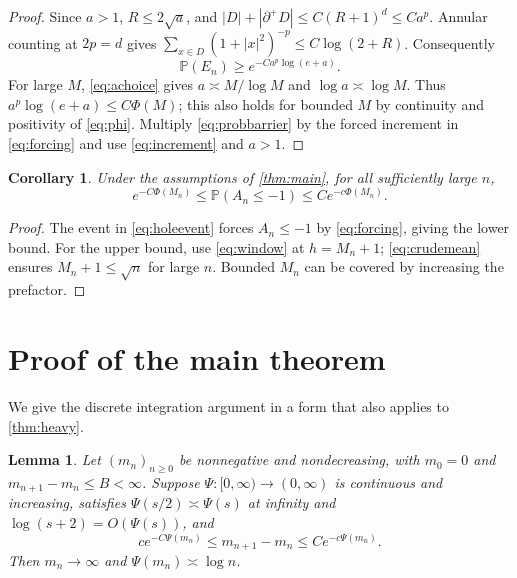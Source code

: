 \documentclass[11pt]{amsart}
\newtheorem{lemma}[theorem]{Lemma}
\newtheorem{corollary}[theorem]{Corollary}
\theoremstyle{remark}
\newcommand{\Pp}{\mathbb P}
\begin{document}
\begin{proof}
Since $a>1$, $R\le2\sqrt a$, and
$|D|+|\partial^+D|\le C(R+1)^d\le Ca^p$.
Annular counting at $2p=d$ gives
$\sum_{x\in D}(1+|x|^2)^{-p}\le C\log(2+R)$.
Consequently
\begin{equation}\label{eq:probbarrier}
 \Pp(E_n)\ge e^{-Ca^p\log(e+a)}.
\end{equation}
For large $M$, \eqref{eq:achoice} gives
$a\asymp M/\log M$ and $\log a\asymp\log M$.
Thus $a^p\log(e+a)\le C\Phi(M)$; this also holds for bounded $M$
by continuity and positivity of \eqref{eq:phi}.
Multiply \eqref{eq:probbarrier} by the forced increment in
\eqref{eq:forcing} and use \eqref{eq:increment} and $a>1$.
\end{proof}

\begin{corollary}\label{cor:event}
Under the assumptions of \cref{thm:main}, for all sufficiently large $n$,
\begin{equation}\label{eq:eventconclusion}
 e^{-C\Phi(M_n)}\le\Pp(A_n\le-1)\le C e^{-c\Phi(M_n)}.
\end{equation}
\end{corollary}

\begin{proof}
The event in \eqref{eq:holeevent} forces $A_n\le-1$ by
\eqref{eq:forcing}, giving the lower bound.
For the upper bound, use \eqref{eq:window} at $h=M_n+1$;
\eqref{eq:crudemean} ensures $M_n+1\le\sqrt n$ for large $n$.
Bounded $M_n$ can be covered by increasing the prefactor.
\end{proof}

\section{Proof of the main theorem}

We give the discrete integration argument in a form that also applies
to \cref{thm:heavy}.

\begin{lemma}\label{lem:integration}
Let $(m_n)_{n\ge0}$ be nonnegative and nondecreasing, with $m_0=0$ and
$m_{n+1}-m_n\le B<\infty$. Suppose $\Psi:[0,\infty)\to(0,\infty)$ is
continuous and increasing, satisfies $\Psi(s/2)\asymp\Psi(s)$ at
infinity and $\log(s+2)=O(\Psi(s))$, and
\begin{equation}\label{eq:twosidedincrements}
 c e^{-C\Psi(m_n)}\le m_{n+1}-m_n\le C e^{-c\Psi(m_n)}.
\end{equation}
Then $m_n\to\infty$ and $\Psi(m_n)\asymp\log n$.
\end{lemma}
\end{document}
